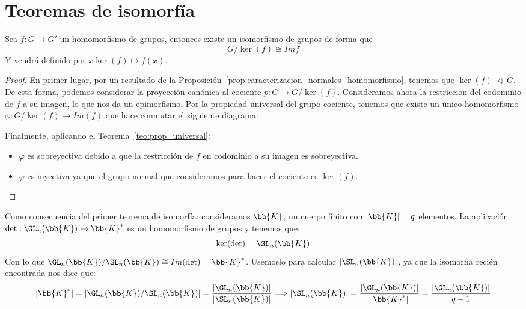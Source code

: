 \section{Teoremas de isomorfía}
\begin{teo}
    Sea $f:G\to G'$ un homomorfismo de grupos, entonces existe un isomorfismo de grupos de forma que
    \begin{equation*}
        G/\ker(f) \cong Imf
    \end{equation*}
    Y vendrá definido por $x\ker(f) \longmapsto f(x)$.
    \begin{proof}
        En primer lugar, por un resultado de la Proposición~\ref{prop:caracterizacion_normales_homomorfismo}, tenemos que ${\ker(f)\ \lhd\ G}$. De esta forma, podemos considerar la proyección canónica al cociente $p:G\to G/\ker(f)$. Consideramos ahora la restriccion del codominio de $f$ a su imagen, lo que nos da un epimorfismo. Por la propiedad universal del grupo cociente, tenemos que existe un único homomorfismo $\varphi:G/\ker(f)\to Im(f)$ que hace conmutar el siguiente diagrama:
    \begin{figure}[H]
        \centering
    \end{figure}
    Finalmente, aplicando el Teorema~\ref{teo:prop_universal}:
    \begin{itemize}
        \item $\varphi$ es sobreyectiva debido a que la restricción de $f$ en codominio a su imagen es sobreyectiva.
        \item $\varphi$ es inyectiva ya que el grupo normal que consideramos para hacer el cociente es $\ker(f)$.\qedhere
    \end{itemize}
    \end{proof}
\end{teo}

\begin{ejemplo}
    Como consecuencia del primer teorema de isomorfía: consideramos $\bb{K}$, un cuerpo finito con $|\bb{K}| = q$ elementos. La aplicación $\det:\GL_n(\bb{K})\to \bb{K}^\ast$ es un homomorfismo de grupos y tenemos que:
    \begin{equation*}
        \ker(\det) = \SL_n(\bb{K})
    \end{equation*}
    Con lo que $\GL_n(\bb{K})/\SL_n(\bb{K}) \cong Im(\det) = \bb{K}^\ast$. Usémoslo para calcular $|\SL_n(\bb{K})|$, ya que la isomorfía recién encontrada nos dice que:
    \begin{equation*}
        |\bb{K}^\ast| = |\GL_n(\bb{K})/\SL_n(\bb{K})| = \dfrac{|\GL_n(\bb{K})|}{|\SL_n(\bb{K})|} \Longrightarrow |\SL_n(\bb{K})| = \dfrac{|\GL_n(\bb{K})|}{|\bb{K}^\ast|} = \dfrac{|\GL_n(\bb{K})|}{q-1}
    \end{equation*}
\end{ejemplo}

